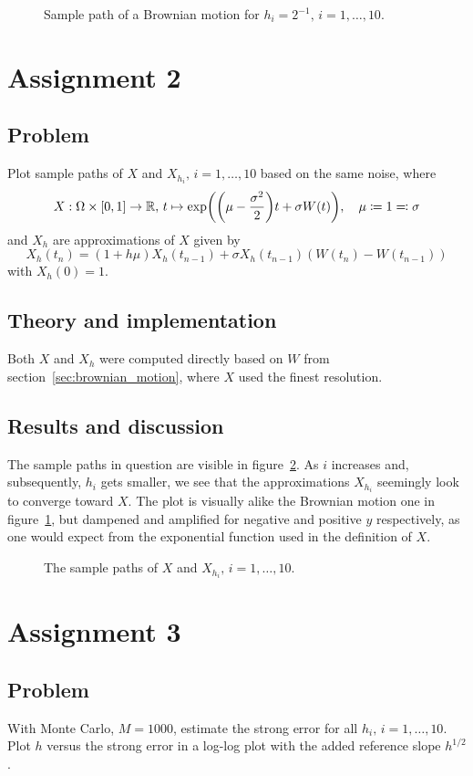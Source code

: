 \documentclass[11pt, a4paper]{article}
\let\originalleft\left
\let\originalright\right
\renewcommand{\left}{\mathopen{}\mathclose\bgroup\originalleft}
\renewcommand{\right}{\aftergroup\egroup\originalright}
\begin{document}
\begin{figure}
	\centering
	
	\caption{Sample path of a Brownian motion for $h_i = 2^{-1}, \, i = 1, \ldots, 10$. \label{fig:brownian_motion}}
\end{figure}

\section{Assignment 2}
\subsection{Problem}
Plot sample paths of $X$ and $X_{h_i}, \, i = 1, \ldots, 10$ based on the same noise,
where
$$ X : \Omega \times [0, 1] \to \mathbb R, \, t \mapsto \exp\left(\left(\mu - \frac{\sigma^2}2\right) t + \sigma W(t)\right), \quad \mu \coloneqq 1 \eqqcolon \sigma $$
and $X_h$ are approximations of $X$ given by
$$ X_h(t_n) = (1 + h \mu) X_h(t_{n-1}) + \sigma X_h(t_{n-1}) (W(t_n) - W(t_{n-1})) $$
with $X_h(0) = 1$.
\subsection{Theory and implementation}
Both $X$ and $X_h$ were computed directly based on $W$ from section~\ref{sec:brownian_motion},
where $X$ used the finest resolution.
\subsection{Results and discussion}
The sample paths in question are visible in figure~\ref{fig:x_sample_path}.
As $i$ increases and, subsequently, $h_i$ gets smaller,
we see that the approximations $X_{h_i}$ seemingly look to converge toward $X$.
The plot is visually alike the Brownian motion one in figure~\ref{fig:brownian_motion},
but dampened and amplified for negative and positive $y$ respectively,
as one would expect from the exponential function used in the definition of $X$.

\begin{figure}
	\centering
	
	\caption{The sample paths of $X$ and $X_{h_i}, \, i = 1, \ldots, 10$. \label{fig:x_sample_path}}
\end{figure}

\section{Assignment 3}\label{sec:strong_error}
\subsection{Problem}
With Monte Carlo, $M = 1000$, estimate the strong error for all $h_i, \, i = 1, \ldots, 10$.
Plot $h$ versus the strong error in a log-log plot with the added reference slope $h^{1/2}$.
\end{document}
